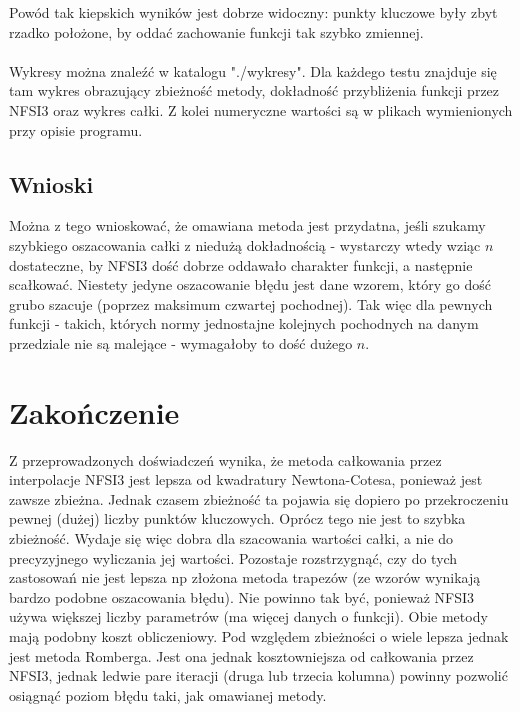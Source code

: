 \documentclass[11pt,wide]{mwart}
\begin{document}
Powód tak kiepskich wyników jest dobrze widoczny: punkty kluczowe były zbyt rzadko położone, by oddać zachowanie funkcji tak szybko zmiennej.\\
{\small{\\Wykresy można znaleźć w katalogu "./wykresy". Dla każdego testu znajduje się tam wykres obrazujący zbieżność metody, dokładność przybliżenia funkcji przez NFSI3 oraz wykres całki. Z kolei numeryczne wartości są w plikach wymienionych przy opisie programu. }} 
\subsection{Wnioski}
Można z tego wnioskować, że omawiana metoda jest przydatna, jeśli szukamy szybkiego oszacowania całki z niedużą dokładnością - wystarczy wtedy wziąc $n$ dostateczne, by NFSI3 dość dobrze oddawało charakter funkcji, a następnie scałkować. Niestety jedyne oszacowanie błędu jest dane wzorem, który go dość grubo szacuje (poprzez maksimum czwartej pochodnej). Tak więc dla pewnych funkcji - takich, których normy jednostajne kolejnych pochodnych na danym przedziale nie są malejące - wymagałoby to dość dużego $n$.
\section{Zakończenie}
Z przeprowadzonych doświadczeń wynika, że metoda całkowania przez interpolacje NFSI3 jest lepsza od kwadratury Newtona-Cotesa, ponieważ jest zawsze zbieżna. Jednak czasem zbieżność ta pojawia się dopiero po przekroczeniu pewnej (dużej) liczby punktów kluczowych. Oprócz tego nie jest to szybka zbieżność. Wydaje się więc dobra dla szacowania wartości całki, a nie do precyzyjnego wyliczania jej wartości. Pozostaje rozstrzygnąć, czy do tych zastosowań nie jest lepsza np złożona metoda trapezów (ze wzorów wynikają bardzo podobne oszacowania błędu). Nie powinno tak być, ponieważ NFSI3 używa większej liczby parametrów (ma więcej danych o funkcji). Obie metody mają podobny koszt obliczeniowy. Pod względem zbieżności o wiele lepsza jednak jest metoda Romberga. Jest ona jednak kosztowniejsza od całkowania przez NFSI3, jednak ledwie pare iteracji (druga lub trzecia kolumna) powinny pozwolić osiągnąć poziom błędu taki, jak omawianej metody.
\end{document}

